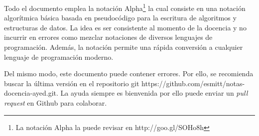 Todo el documento emplea la notación Alpha\footnote{La notación Alpha la puede revisar en http://goo.gl/SOHo8h} la cual consiste en una notación algorítmica básica basada en pseudocódigo para la escritura de algoritmos y estructuras de datos. La idea es ser consistente al momento de la docencia y no incurrir en errores como mezclar notaciones de diversos lenguajes de programación. Además, la notación permite una rápida conversión a cualquier lenguaje de programación moderno.

Del mismo modo, este documento puede contener errores. Por ello, se recomienda buscar la última versión en el repositorio git https://github.com/esmitt/notas-docencia-ayed.git. La ayuda siempre es bienvenida por ello puede enviar un \textit{pull request} en Github para colaborar.